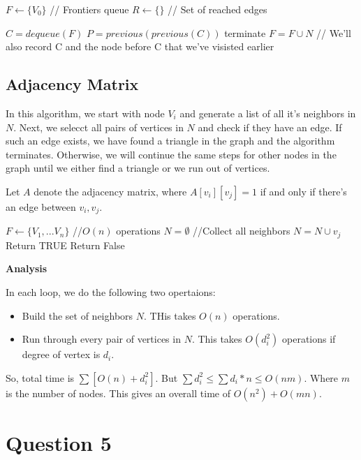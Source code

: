 \documentclass[a4paper]{article}
\begin{document}
\begin{algorithmic}
 \STATE $F \leftarrow \{ V_{0} \}$ // Frontiers queue
 \STATE $R \leftarrow \{ \}$ // Set of reached edges

 \STATE $C = dequeue(F)$
 \STATE $P = previous(previous(C))$
 \STATE terminate
 \ENDIF
 \STATE $F = F \cup N$
 \STATE // We'll also record C and the node before C that we've visisted earlier
 \ENDIF
 \ENDFOR
 \ENDWHILE
\end{algorithmic}

\subsection*{Adjacency Matrix}
In this algorithm, we start with node $V_i$ and generate a list of all it's neighbors in $N$. Next, we selecct all pairs of vertices in $N$ and check if they have an edge. If such an edge exists, we have found a triangle in the graph and the algorithm terminates. Otherwise, we will continue the same steps for other nodes in the graph until we either find a triangle or we run out of vertices.

Let $A$ denote the adjacency matrix, where $A[v_i][v_j] = 1$ if and only if there's an edge between $v_i, v_j$.

\begin{algorithmic}
  
 \STATE $F \leftarrow \{V_1, ... V_n \}$
   \STATE //$O(n)$ operations
  \STATE $N = \emptyset$
    \STATE //Collect all neighbors
    \STATE $N = N \cup v_j$
   \ENDIF
     \STATE Return TRUE
     \ENDIF
   \ENDFOR
  \ENDFOR
 \ENDFOR
 \STATE Return False
\end{algorithmic}

\textbf{Analysis}

In each loop, we do the following two opertaions:
\begin{itemize}
\item Build the set of neighbors $N$. THis takes $O(n)$ operations.
\item Run through every pair of vertices in $N$. This takes $O(d_i^2)$ operations if degree of vertex is $d_i$.
\end{itemize}
So, total time is $\sum [O(n) + d_i^2]$. But $\sum d_i^2 \leq \sum d_i * n \leq O(nm)$. Where $m$ is the number of nodes. This gives an overall time of $O(n^2) + O(mn)$.



\section*{Question 5}
\end{document}
